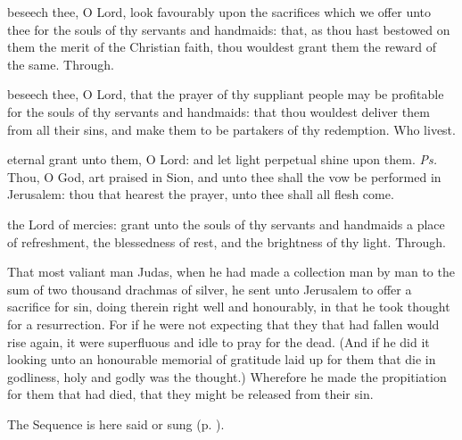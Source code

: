 \secret
{} beseech thee, O Lord, look favourably upon the sacrifices which we offer unto thee for the souls of thy servants and handmaids: that, as thou hast bestowed on them the merit of the Christian faith, thou wouldest grant them the reward of the same. Through.


\postcommunion
{} beseech thee, O Lord, that the prayer of thy suppliant people may be profitable for the souls of thy servants and handmaids: that thou wouldest deliver them from all their sins, and make them to be partakers of thy redemption. Who livest.


\label{AllSoulsII}

\introit
{} eternal grant unto them, O Lord: and let light perpetual shine upon them. \textit{Ps.} Thou, O God, art praised in Sion, and unto thee shall the vow be performed in Jerusalem: thou that hearest the prayer, unto thee shall all flesh come.

\collect
{} the Lord of mercies: grant unto the souls of thy servants and handmaids a place of refreshment, the blessedness of rest, and the brightness of thy light. Through.

 That most valiant man Judas, when he had made a collection man by man to the sum of two thousand drachmas of silver, he sent unto Jerusalem to offer a sacrifice for sin, doing therein right well and honourably, in that he took thought for a resurrection. For if he were not expecting that they that had fallen would rise again, it were superfluous and idle to pray for the dead. (And if he did it looking unto an honourable memorial of gratitude laid up for them that die in godliness, holy and godly was the thought.) Wherefore he made the propitiation for them that had died, that they might be released from their sin. 

\begin{rubric}
    The Sequence  is here said or sung (p. \pageref{diesirae}).
\end{rubric}

